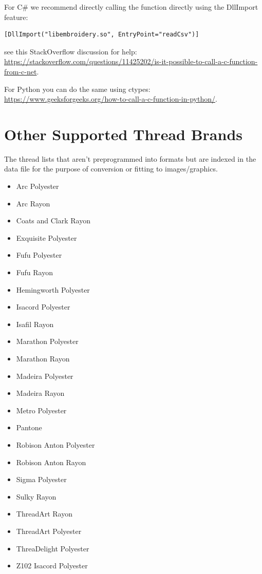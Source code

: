 \documentclass{report}
\begin{document}
For C\# we recommend directly calling the function directly
using the DllImport feature:

\begin{lstlisting}
[DllImport("libembroidery.so", EntryPoint="readCsv")]
\end{lstlisting}

see this StackOverflow discussion for help: \url{https://stackoverflow.com/questions/11425202/is-it-possible-to-call-a-c-function-from-c-net}.

For Python you can do the same using ctypes: \url{https://www.geeksforgeeks.org/how-to-call-a-c-function-in-python/}.

\section{Other Supported Thread Brands}

The thread lists that aren't preprogrammed into formats but are indexed in the data file for the purpose of conversion or fitting to images/graphics.

\begin{itemize}
\item Arc Polyester
\item Arc Rayon
\item Coats and Clark Rayon
\item Exquisite Polyester
\item Fufu Polyester
\item Fufu Rayon
\item Hemingworth Polyester
\item Isacord Polyester
\item Isafil Rayon
\item Marathon Polyester
\item Marathon Rayon
\item Madeira Polyester
\item Madeira Rayon
\item Metro Polyester
\item Pantone
\item Robison Anton Polyester
\item Robison Anton Rayon
\item Sigma Polyester
\item Sulky Rayon
\item ThreadArt Rayon
\item ThreadArt Polyester
\item ThreaDelight Polyester
\item Z102 Isacord Polyester
\end{itemize}








\appendix



\printindex
\end{document}
